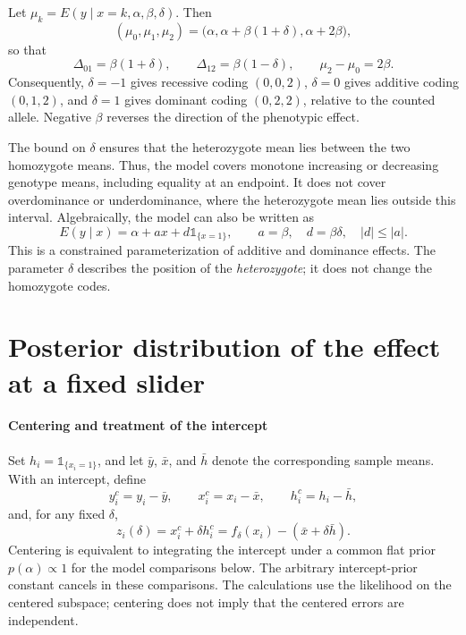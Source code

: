 \documentclass[11pt]{article}
\newcommand{\ind}{\mathbb{1}}
\begin{document}
Let $\mu_k=E(y\mid x=k,\alpha,\beta,\delta)$. Then
\begin{equation}
(\mu_0,\mu_1,\mu_2)
 =\bigl(\alpha,\alpha+\beta(1+\delta),\alpha+2\beta\bigr),
\end{equation}
so that
\begin{equation}
\Delta_{01}=\beta(1+\delta),\qquad
\Delta_{12}=\beta(1-\delta),\qquad
\mu_2-\mu_0=2\beta.
\end{equation}
Consequently, $\delta=-1$ gives recessive coding $(0,0,2)$,
$\delta=0$ gives additive coding $(0,1,2)$, and $\delta=1$ gives
dominant coding $(0,2,2)$, relative to the counted allele. Negative
$\beta$ reverses the direction of the phenotypic effect.

The bound on $\delta$ ensures that the heterozygote mean lies between
the two homozygote means. Thus, the model covers monotone increasing
or decreasing genotype means, including equality at an endpoint. It
does not cover overdominance or underdominance, where the heterozygote
mean lies outside this interval. Algebraically, the model can also be
written as
\begin{equation}
E(y\mid x)=\alpha+a x+d\ind_{\{x=1\}},
\qquad a=\beta,\quad d=\beta\delta,\quad |d|\leq|a|.
\end{equation}
This is a constrained parameterization of additive and dominance
effects. The parameter $\delta$ describes the position of the
\emph{heterozygote}; it does not change the homozygote codes.

\section{Posterior distribution of the effect at a fixed slider}
\paragraph{Centering and treatment of the intercept}

Set $h_i=\ind_{\{x_i=1\}}$, and let $\bar y$, $\bar x$, and $\bar h$
denote the corresponding sample means. With an intercept, define
\begin{equation}
y_i^c=y_i-\bar y,\qquad
x_i^c=x_i-\bar x,\qquad
h_i^c=h_i-\bar h,
\end{equation}
and, for any fixed $\delta$,
\begin{equation}
z_i(\delta)=x_i^c+\delta h_i^c
 =f_\delta(x_i)-(\bar x+\delta\bar h).
\label{eq:centered-design}
\end{equation}
Centering is equivalent to integrating the intercept under a common
flat prior $p(\alpha)\propto1$ for the model comparisons below. The
arbitrary intercept-prior constant cancels in these comparisons.
The calculations use the likelihood on the centered subspace;
centering does not imply that the centered errors are independent.
\end{document}
